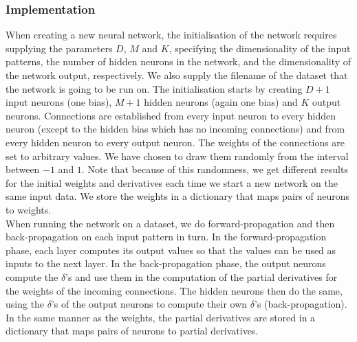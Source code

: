 \documentclass[a4paper]{article}
\begin{document}
\subsubsection{Implementation}
When creating a new neural network, the initialisation of the network requires supplying the parameters $D$, $M$ and $K$, specifying the dimensionality of the input patterns, the number of hidden neurons in the network, and the dimensionality of the network output, respectively. We also supply the filename of the dataset that the network is going to be run on. The initialisation starts by creating $D+1$ input neurons (one bias), $M+1$ hidden neurons (again one bias) and $K$ output neurons. Connections are established from every input neuron to every hidden neuron (except to the hidden bias which has no incoming connections) and from every hidden neuron to every output neuron. The weights of the connections are set to arbitrary values. We have chosen to draw them randomly from the interval between $-1$ and $1$. Note that because of this randomness, we get different results for the initial weights and derivatives each time we start a new network on the same input data. We store the weights in a dictionary that maps pairs of neurons to weights.\\

When running the network on a dataset, we do forward-propagation and then back-propagation on each input pattern in turn. In the forward-propagation phase, each layer computes its output values so that the values can be used as inputs to the next layer. In the back-propagation phase, the output neurons compute the $\delta$'s and use them in the computation of the partial derivatives for the weights of the incoming connections. The hidden neurons then do the same, using the $\delta$'s of the output neurons to compute their own $\delta$'s (back-propagation). In the same manner as the weights, the partial derivatives are stored in a dictionary that maps pairs of neurons to partial derivatives.\\
\end{document}

